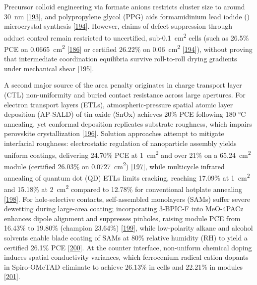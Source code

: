 \documentclass[
  11pt,
]{article}
\begin{document}
Precursor colloid engineering via formate anions restricts cluster size
to around \qty{30}{\nano\meter}
{[}\href{https://doi.org/10.1002/adma.202520776}{193}{]}, and
polypropylene glycol (PPG) aids formamidinium lead iodide ()
microcrystal synthesis
{[}\href{https://doi.org/10.1002/adma.202522508}{194}{]}. However,
claims of defect suppression through adduct control remain restricted to
uncertified, sub-\qty{0.1}{\centi\meter\squared} cells (such as 26.5\%
PCE on \qty{0.0665}{\centi\meter\squared}
{[}\href{https://doi.org/10.1038/s41467-026-68439-8}{186}{]} or
certified 26.22\% on \qty{0.06}{\centi\meter\squared}
{[}\href{https://doi.org/10.1002/adma.202522508}{194}{]}), without
proving that intermediate coordination equilibria survive roll-to-roll
drying gradients under mechanical shear
{[}\href{https://doi.org/10.20517/ss.2025.128}{195}{]}.

A second major source of the area penalty originates in charge transport
layer (CTL) non-uniformity and buried contact resistance across large
apertures. For electron transport layers (ETLs), atmospheric-pressure
spatial atomic layer deposition (AP-SALD) of tin oxide (SnOx) achieves
20\% PCE following 180 °C annealing, yet conformal deposition replicates
substrate roughness, which impairs perovskite crystallization
{[}\href{https://doi.org/10.1016/j.solmat.2026.114233}{196}{]}. Solution
approaches attempt to mitigate interfacial roughness: electrostatic
regulation of  nanoparticle assembly yields uniform coatings,
delivering 24.70\% PCE at \qty{1}{\centi\meter\squared} and over 21\% on
a \qty{65.24}{\centi\meter\squared} module (certified 26.03\% on
\qty{0.0727}{\centi\meter\squared})
{[}\href{https://doi.org/10.1021/acsenergylett.6c00476}{197}{]}, while
multicycle infrared annealing of  quantum dot (QD) ETLs limits
cracking, reaching 17.09\% at \qty{1}{\centi\meter\squared} and 15.18\%
at \qty{2}{\centi\meter\squared} compared to 12.78\% for conventional
hotplate annealing
{[}\href{https://doi.org/10.1016/j.rineng.2026.111690}{198}{]}. For
hole-selective contacts, self-assembled monolayers (SAMs) suffer severe
dewetting during large-area coating; incorporating 3-BPIC-F into
MeO-4PACz enhances dipole alignment and suppresses pinholes, raising
module PCE from 16.43\% to 19.80\% (champion 23.64\%)
{[}\href{https://doi.org/10.1021/acsami.6c03670}{199}{]}, while
low-polarity alkane and alcohol solvents enable blade coating of SAMs at
80\% relative humidity (RH) to yield a certified 26.1\% PCE
{[}\href{https://doi.org/10.1038/s41467-026-72581-8}{200}{]}. At the
counter interface, non-uniform chemical doping induces spatial
conductivity variances, which ferrocenium radical cation dopants in
Spiro-OMeTAD eliminate to achieve 26.13\% in cells and 22.21\% in
modules {[}\href{https://doi.org/10.1016/j.joule.2025.102310}{201}{]}.
\end{document}
